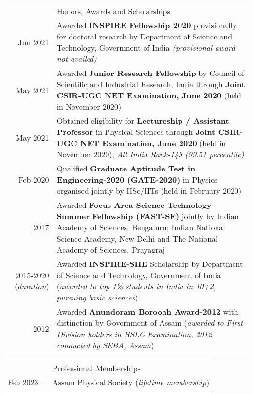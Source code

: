 \documentclass[a4paper, 11pt]{article}
\newcommand{\headingfont}{\Large\color{Bittersweet}}
\newenvironment{SectionTable}[1]{
	\renewcommand*{\arraystretch}{1.7}
	\setlength{\tabcolsep}{10pt}
	\begin{longtable}{Rp{5.2in}} & #1 \\}
{\end{longtable}\vspace{-.3cm}}
\begin{document}
\begin{SectionTable}{\headingfont Honors, Awards and Scholarships}
Jun 2021 & 
Awarded \textbf{INSPIRE Fellowship 2020} provisionally for doctoral research by Department of Science and Technology, Government of India \textit{(provisional award not availed)}
\\
	
May 2021 &
Awarded \textbf{Junior Research Fellowship} by Council of Scientific and
Industrial Research, India through \textbf{Joint CSIR-UGC NET Examination, June 2020}
(held in November 2020) \\ %
	
May 2021 &
Obtained eligibility for \textbf{Lectureship / Assistant Professor} in Physical Sciences through \textbf{Joint CSIR-UGC NET Examination, June 2020}
(held in November 2020), \textit{All India Rank-149 (99.51 percentile)} \\
	
Feb 2020 &
Qualified \textbf{Graduate Aptitude Test in Engineering-2020 (GATE-2020)} in Physics organised jointly by IISc/IITs (held in February 2020) \\
	
2017 &
Awarded \textbf{Focus Area Science Technology Summer Fellowship (FAST-SF)} jointly by Indian Academy of Sciences, Bengaluru; Indian National Science Academy, New Delhi and The National Academy of Sciences, Prayagraj \\
	
2015-2020 (\textit{duration})&
Awarded \textbf{INSPIRE-SHE} Scholarship by Department of Science and Technology, Government of India (\textit{awarded to top 1\% students in India in 10+2, pursuing basic sciences}) \\
	
2012 &
Awarded \textbf{Anundoram Borooah Award-2012} with distinction by Government of Assam (\textit{awarded to First Division holders in HSLC Examination, 2012 conducted by SEBA, Assam})
	
\end{SectionTable}


\begin{SectionTable}{\headingfont Professional Memberships}
Feb 2023 --  &
Assam Physical Society (\textit{lifetime membership}) \\

\end{SectionTable}
\end{document}
